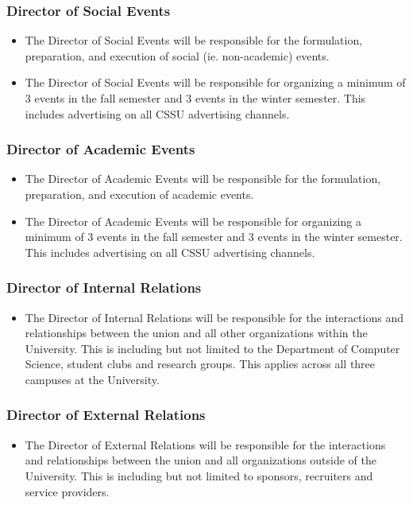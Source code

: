 \documentclass{article}
\begin{document}
\subsubsection{Director of Social Events} \label{sec:2.2.4}
\begin{itemize}
    \item The Director of Social Events will be responsible for the formulation, preparation, and execution
of social (ie. non-academic) events.
    \item The Director of Social Events will be responsible for organizing a minimum of 3 events in the fall
semester and 3 events in the winter semester. This includes advertising on all CSSU advertising
channels.
\end{itemize}

\subsubsection{Director of Academic Events} \label{sec:2.2.5}
\begin{itemize}
    \item The Director of Academic Events will be responsible for the formulation, preparation, and
execution of academic events.
    \item The Director of Academic Events will be responsible for organizing a minimum of 3 events in the
fall semester and 3 events in the winter semester. This includes advertising on all CSSU
advertising channels.
\end{itemize}

\subsubsection{Director of Internal Relations} \label{sec:2.2.6}
\begin{itemize}
    \item The Director of Internal Relations will be responsible for the interactions and relationships
between the union and all other organizations within the University. This is including but not
limited to the Department of Computer Science, student clubs and research groups. This
applies across all three campuses at the University.
\end{itemize}

\subsubsection{Director of External Relations} \label{sec:2.2.7}
\begin{itemize}
    \item The Director of External Relations will be responsible for the interactions and relationships
between the union and all organizations outside of the University. This is including but not
limited to sponsors, recruiters and service providers.
\end{itemize}
\end{document}
